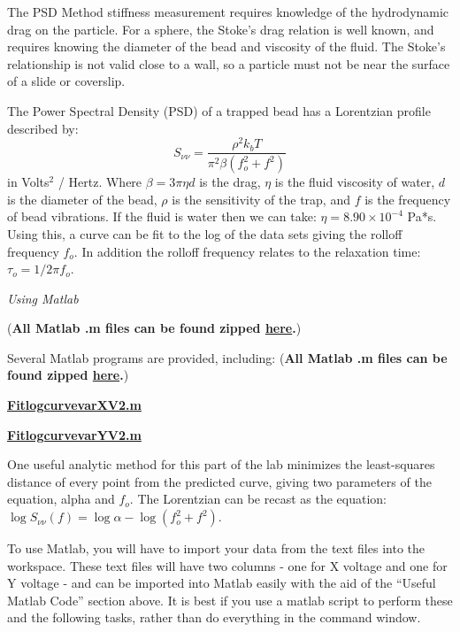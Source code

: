 \documentclass{../lab}
\begin{document}
The PSD Method stiffness measurement requires knowledge of the hydrodynamic drag on the particle. For a sphere, the Stoke's drag relation is well known, and requires knowing the diameter of the bead and viscosity of the fluid. The Stoke's relationship is not valid close to a wall, so a particle must not be near the surface of a slide or coverslip.

The Power Spectral Density (PSD) \cite{Reif} of a trapped bead has a Lorentzian profile described by:
\begin{equation}
    S_{\nu\nu} = \frac{\rho^2 k_b T}{\pi^2 \beta(f_o^2+f^2)}
\end{equation}
in Volts$^2$ / Hertz. Where $\beta = 3\pi\eta d$ is the drag, $\eta$ is the fluid viscosity of water, $d$ is the diameter of the bead, $\rho$ is the sensitivity of the trap, and $f$ is the frequency of bead vibrations. If the fluid is water then we can take: $\eta = 8.90 \times 10^{-4}$ Pa*s. Using this, a curve can be fit to the log of the data sets giving the rolloff frequency $f_o$. In addition the rolloff frequency relates to the relaxation time: $\tau_o = 1/2\pi f_o$.

\emph{Using Matlab}

(\textbf{All Matlab .m files can be found zipped  \href{http://experimentationlab.berkeley.edu/sites/default/files/ZIP\_files/OTZ\_Matlab\_files.zip}{here}.})

Several Matlab programs are provided, including: (\textbf{All Matlab .m files can be found zipped  \href{http://experimentationlab.berkeley.edu/sites/default/files/ZIP\_files/OTZ\_Matlab\_files.zip}{here}.})

\href{http://experimentationlab.berkeley.edu/sites/default/files/matlab\_fitting/FitlogcurvevarXV2.m}{\textbf{FitlogcurvevarXV2.m}}

\href{http://experimentationlab.berkeley.edu/sites/default/files/matlab\_fitting/FitlogcurvevarYV2.m}{\textbf{FitlogcurvevarYV2.m}}

One useful analytic method for this part of the lab minimizes the least-squares distance of every point from the predicted curve, giving two parameters of the equation, alpha and $f_o$. The Lorentzian can be recast as the equation: $\log{S_{\nu\nu}(f)} = \log{\alpha} - \log{(f_o^2+f^2)}$.

To use Matlab, you will have to import your data from the text files into the workspace. These text files will have two columns - one for X voltage and one for Y voltage - and can be imported into Matlab easily with the aid of the ``Useful Matlab Code'' section above. It is best if you use a matlab script to perform these and the following tasks, rather than do everything in the command window.
\end{document}
